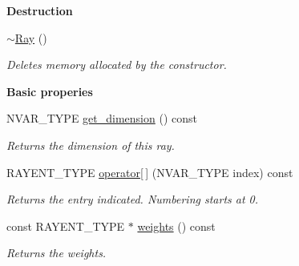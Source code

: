 \begin{Indent}\textbf{ Destruction}\par
\begin{DoxyCompactItemize}
\item 
\hyperlink{group___c_l_s_solvers_a4819e44c9151ea96204a5ca5233646f6}{$\sim$\+Ray} ()
\begin{DoxyCompactList}\small\item\em Deletes memory allocated by the constructor. \end{DoxyCompactList}\end{DoxyCompactItemize}
\end{Indent}
\begin{Indent}\textbf{ Basic properies}\par
\begin{DoxyCompactItemize}
\item 
\mbox{\label{group___c_l_s_solvers_afa50278b90d4a5482326d351cdf556fc}} 
N\+V\+A\+R\+\_\+\+T\+Y\+PE \hyperlink{group___c_l_s_solvers_afa50278b90d4a5482326d351cdf556fc}{get\+\_\+dimension} () const
\begin{DoxyCompactList}\small\item\em Returns the dimension of this ray. \end{DoxyCompactList}\item 
\mbox{\label{group___c_l_s_solvers_a340608efd12ab0f65173a6c0c05e6309}} 
R\+A\+Y\+E\+N\+T\+\_\+\+T\+Y\+PE \hyperlink{group___c_l_s_solvers_a340608efd12ab0f65173a6c0c05e6309}{operator\mbox{[}$\,$\mbox{]}} (N\+V\+A\+R\+\_\+\+T\+Y\+PE index) const
\begin{DoxyCompactList}\small\item\em Returns the entry indicated. Numbering starts at 0. \end{DoxyCompactList}\item 
\mbox{\label{group___c_l_s_solvers_a0651d47b9e0b2a332e102c56447a1295}} 
const R\+A\+Y\+E\+N\+T\+\_\+\+T\+Y\+PE $\ast$ \hyperlink{group___c_l_s_solvers_a0651d47b9e0b2a332e102c56447a1295}{weights} () const
\begin{DoxyCompactList}\small\item\em Returns the weights. \end{DoxyCompactList}\item 
\mbox{\label{group___c_l_s_solvers_a66e4d7533edb52e344eb68c7e723a65c}} 

\end{DoxyCompactItemize}
\end{Indent}
